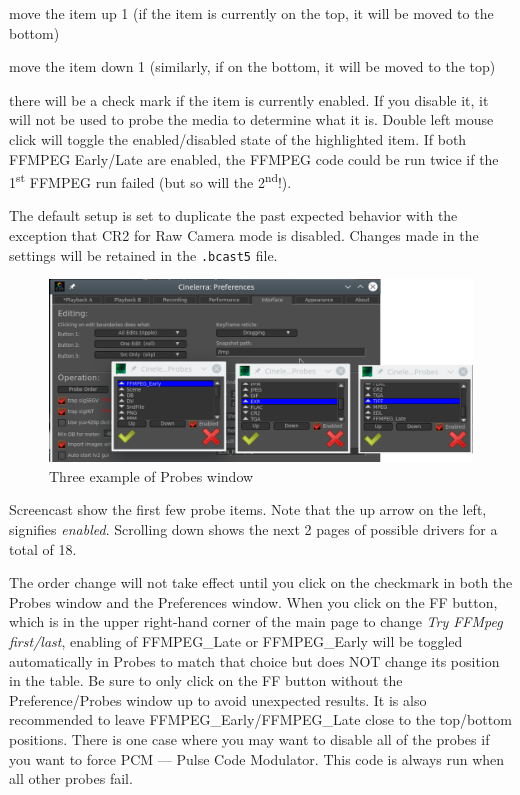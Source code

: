 \begin{description} [noitemsep]
    \item[Up] move the item up 1 (if the item is currently on the top, it will be moved to the bottom)
    \item[Down] move the item down 1 (similarly, if on the bottom, it will be moved to the top)
    \item[Enable] there will be a check mark if the item is currently enabled.  If you disable it, it will not be used to probe the media to determine what it is.  Double left mouse click will toggle the enabled/disabled state of the highlighted item.  If both FFMPEG Early/Late are enabled, the FFMPEG code could be run twice if the 1\textsuperscript{st} FFMPEG run failed (but so will the 2\textsuperscript{nd}!).
\end{description}

The default setup is set to duplicate the past expected behavior with the exception that CR2 for Raw Camera mode is disabled.  Changes made in the settings will be retained in the \texttt{.bcast5} file.

\begin{figure}[htpb]
    \centering
    \includegraphics[width=0.9\linewidth]{images/probe.png}
    \caption{Three example of Probes window}
    \label{fig:probe}
\end{figure}

Screencast show the first few probe items.  Note that the up arrow on the left, signifies \textit{enabled}.
Scrolling down shows the next 2 pages of possible drivers for a total of 18.

The order change will not take effect until you click on the checkmark in both the Probes window and the Preferences window.  When you click on the FF button, which is in the upper right-hand corner of the main page to change \textit{Try FFMpeg first/last}, enabling of FFMPEG\_Late or FFMPEG\_Early will be toggled automatically in Probes to match that choice but does NOT change its position in the table. Be sure to only click on the FF button without the Preference/Probes window up to avoid unexpected results.  It is also recommended to leave FFMPEG\_Early/FFMPEG\_Late close to the top/bottom positions.  There is one case where you may want to disable all of the probes if you want to force PCM --- Pulse Code Modulator.  This code is always run when all other probes fail.

